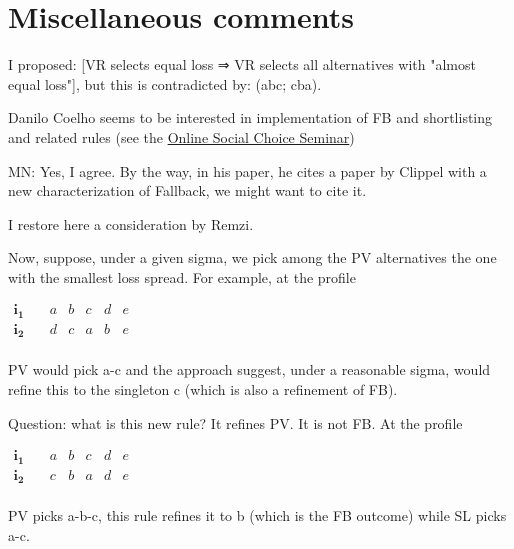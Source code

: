 \documentclass[version=3.21, pagesize, twoside=off, bibliography=totoc, DIV=calc, fontsize=12pt, a4paper]{scrartcl}
\begin{document}
\section{Miscellaneous comments}
I proposed: [VR selects equal loss ⇒ VR selects all alternatives with "almost equal loss"], but this is contradicted by: (abc; cba).


Danilo Coelho seems to be interested in implementation of FB and shortlisting and related rules (see the \href{https://www.cmss.auckland.ac.nz/2020/06/03/online-social-choice-seminar-series/}{Online Social Choice Seminar})

\color{green}MN: Yes, I agree. By the way, in his paper, he cites a paper by Clippel with a new characterization of Fallback, we might want to cite it.\color{black}

%

\appendix

I restore here a consideration by Remzi.

\begin{remark}[Consideration]
Now, suppose, under a given sigma, we pick among the PV alternatives the one with the smallest loss spread. For example, at the profile 
\begin{center}
	$
	\begin{array}{cccccc}
		\mathbf{i_1} \quad &a&b&c&d&e\\
		\mathbf{i_2} \quad &d&c&a&b&e\\
	\end{array}
	$
\end{center}

PV would pick a-c and the approach suggest, under a reasonable sigma, would refine this to the singleton c (which is also a refinement of FB).

Question: what is this new rule? It refines PV. It is not FB. At the profile

\begin{center}
	$
	\begin{array}{cccccc}
		\mathbf{i_1} \quad &a&b&c&d&e\\
		\mathbf{i_2} \quad &c&b&a&d&e\\
	\end{array}
	$
\end{center}

PV picks a-b-c, this rule refines it to b (which is the FB outcome) while SL picks a-c.
\end{remark}
 
\end{document}
